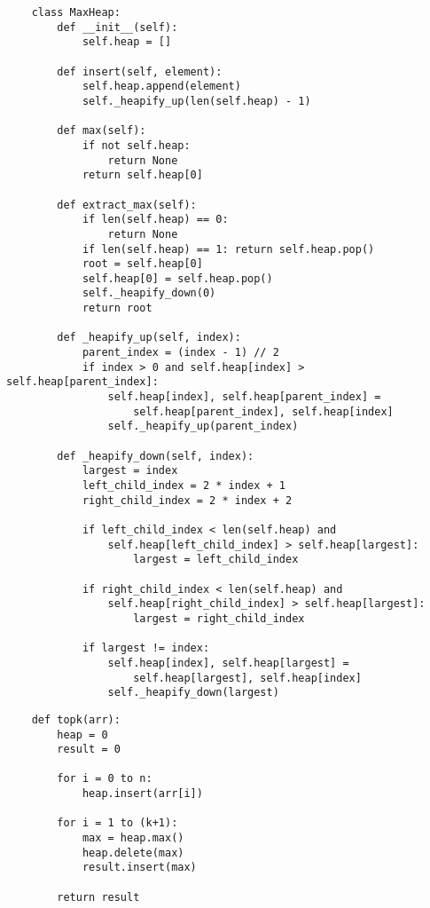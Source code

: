 \documentclass[12pt, letterpaper]{article}
\begin{document}
\begin{verbatim}
    class MaxHeap:
        def __init__(self):
            self.heap = []

        def insert(self, element):
            self.heap.append(element)
            self._heapify_up(len(self.heap) - 1)

        def max(self):
            if not self.heap:
                return None
            return self.heap[0]

        def extract_max(self):
            if len(self.heap) == 0:
                return None
            if len(self.heap) == 1: return self.heap.pop()
            root = self.heap[0]
            self.heap[0] = self.heap.pop()
            self._heapify_down(0)
            return root

        def _heapify_up(self, index):
            parent_index = (index - 1) // 2
            if index > 0 and self.heap[index] > self.heap[parent_index]:
                self.heap[index], self.heap[parent_index] = 
                    self.heap[parent_index], self.heap[index]
                self._heapify_up(parent_index)

        def _heapify_down(self, index):
            largest = index
            left_child_index = 2 * index + 1
            right_child_index = 2 * index + 2

            if left_child_index < len(self.heap) and 
                self.heap[left_child_index] > self.heap[largest]:
                    largest = left_child_index

            if right_child_index < len(self.heap) and
                self.heap[right_child_index] > self.heap[largest]:
                    largest = right_child_index

            if largest != index:
                self.heap[index], self.heap[largest] =
                    self.heap[largest], self.heap[index]
                self._heapify_down(largest)
\end{verbatim}


\begin{verbatim}
    def topk(arr):
        heap = 0
        result = 0
        
        for i = 0 to n:
            heap.insert(arr[i])
        
        for i = 1 to (k+1):
            max = heap.max()
            heap.delete(max)
            result.insert(max)
        
        return result
\end{verbatim}
\end{document}
